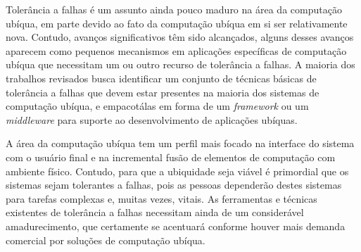 Tolerância a falhas é um assunto ainda pouco maduro na área da computação ubíqua, em parte devido ao fato da computação ubíqua em si ser relativamente nova. Contudo, avanços significativos têm sido alcançados, alguns desses avanços aparecem como pequenos mecanismos em aplicações específicas de computação ubíqua que necessitam um ou outro recurso de tolerância a falhas. A maioria dos trabalhos revisados busca identificar um conjunto de técnicas básicas de tolerância a falhas que devem estar presentes na maioria dos sistemas de computação ubíqua, e empacotálas em forma de um \emph{framework} ou um \emph{middleware} para suporte ao desenvolvimento de aplicações ubíquas.

A área da computação ubíqua tem um perfil mais focado na interface do sistema com o usuário final e na incremental fusão de elementos de computação com ambiente físico. Contudo, para que a ubiquidade seja viável é primordial que os sistemas sejam tolerantes a falhas, pois as pessoas dependerão destes sistemas para tarefas complexas e, muitas vezes, vitais. As ferramentas e técnicas existentes de tolerância a falhas necessitam ainda de um considerável amadurecimento, que certamente se acentuará conforme houver mais demanda comercial por soluções de computação ubíqua.
